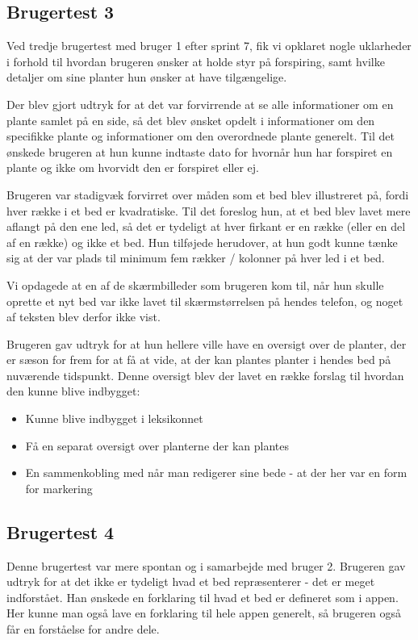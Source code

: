 \subsection{Brugertest 3}

Ved tredje brugertest med bruger 1 efter sprint 7, fik vi opklaret nogle uklarheder i forhold til hvordan brugeren ønsker at holde styr på forspiring, samt hvilke detaljer om sine planter hun ønsker at have tilgængelige.

Der blev gjort udtryk for at det var forvirrende at se alle informationer om en plante samlet på en side, så det blev ønsket opdelt i informationer om den specifikke plante og informationer om den overordnede plante generelt. Til det ønskede brugeren at hun kunne indtaste dato for hvornår hun har forspiret en plante og ikke om hvorvidt den er forspiret eller ej.

Brugeren var stadigvæk forvirret over måden som et bed blev illustreret på, fordi hver række i et bed er kvadratiske. Til det foreslog hun, at et bed blev lavet mere aflangt på den ene led, så det er tydeligt at hver firkant er en række (eller en del af en række) og ikke et bed. Hun tilføjede herudover, at hun godt kunne tænke sig at der var plads til minimum fem rækker / kolonner på hver led i et bed.

Vi opdagede at en af de skærmbilleder som brugeren kom til, når hun skulle oprette et nyt bed var ikke lavet til skærmstørrelsen på hendes telefon, og noget af teksten blev derfor ikke vist.

Brugeren gav udtryk for at hun hellere ville have en oversigt over de planter, der er sæson for frem for at få at vide, at der kan plantes planter i hendes bed på nuværende tidspunkt. Denne oversigt blev der lavet en række forslag til hvordan den kunne blive indbygget:

\begin{itemize}
    \item Kunne blive indbygget i leksikonnet
    \item Få en separat oversigt over planterne der kan plantes
    \item En sammenkobling med når man redigerer sine bede - at der her var en form for markering
\end{itemize}

\subsection{Brugertest 4}

Denne brugertest var mere spontan og i samarbejde med bruger 2. Brugeren gav udtryk for at det ikke er tydeligt hvad et bed repræsenterer - det er meget indforstået. Han ønskede en forklaring til hvad et bed er defineret som i appen. Her kunne man også lave en forklaring til hele appen generelt, så brugeren også får en forståelse for andre dele.

